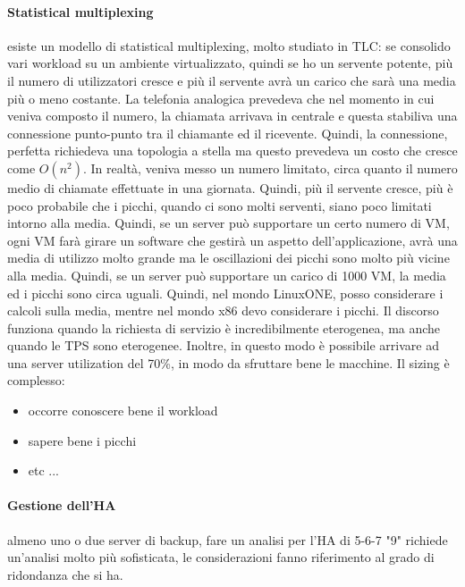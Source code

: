 \documentclass{article}
\begin{document}
\paragraph{Statistical multiplexing}esiste un modello di statistical multiplexing, molto studiato in TLC: se consolido vari workload su un ambiente virtualizzato, quindi se ho un servente potente, più il numero di utilizzatori cresce e più il servente avrà un carico che sarà una media più o meno costante. La telefonia analogica prevedeva che nel momento in cui veniva composto il numero, la chiamata arrivava in centrale e questa stabiliva una connessione punto-punto tra il chiamante ed il ricevente. Quindi, la connessione, perfetta richiedeva una topologia a stella ma questo prevedeva un costo che cresce come $O(n^2)$. In realtà, veniva messo un numero limitato, circa quanto il numero medio di chiamate effettuate in una giornata. Quindi, più il servente cresce, più è poco probabile che i picchi, quando ci sono molti serventi, siano poco limitati intorno alla media. Quindi, se un server può supportare un certo numero di VM, ogni VM farà girare un software che gestirà un aspetto dell'applicazione, avrà una media di utilizzo molto grande ma le oscillazioni dei picchi sono molto più vicine alla media. Quindi, se un server può supportare un carico di 1000 VM, la media ed i picchi sono circa uguali. Quindi, nel mondo LinuxONE, posso considerare i calcoli sulla media, mentre nel mondo x86 devo considerare i picchi. Il discorso funziona quando la richiesta di servizio è incredibilmente eterogenea, ma anche quando le TPS sono eterogenee. Inoltre, in questo modo è possibile arrivare ad una server utilization del 70\%, in modo da sfruttare bene le macchine. Il sizing è complesso:
\begin{itemize}
\item occorre conoscere bene il workload
\item sapere bene i picchi
\item etc ...
\end{itemize}
\paragraph{Gestione dell'HA}almeno uno o due server di backup, fare un analisi per l'HA di 5-6-7 "9" richiede un'analisi molto più sofisticata, le considerazioni fanno riferimento al grado di ridondanza che si ha.
\end{document}
